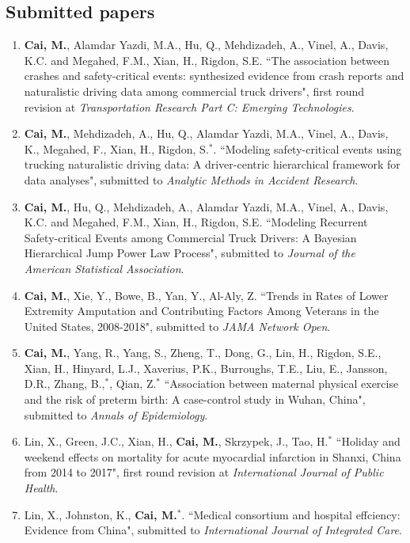\documentclass[11pt, a4paper]{article}
\begin{document}
	\subsection*{Submitted papers}
	\begin{enumerate}[leftmargin=0ex,itemsep=1ex]
		\item \textbf{Cai, M.}, Alamdar Yazdi, M.A., Hu, Q., Mehdizadeh, A., Vinel, A., Davis, K.C. and Megahed, F.M., Xian, H., Rigdon, S.E. ``The association between crashes and safety-critical events: synthesized evidence from crash reports and naturalistic driving data among commercial truck drivers", first round revision at \emph{Transportation Research Part C: Emerging Technologies}.
		
		\item \textbf{Cai, M.}, Mehdizadeh, A., Hu, Q., Alamdar Yazdi, M.A., Vinel, A., Davis, K., Megahed, F., Xian, H., Rigdon, S.$^\ast$. ``Modeling safety-critical events using trucking naturalistic driving data: A driver-centric hierarchical framework for data analyses", submitted to \emph{Analytic Methods in Accident Research}.
		
		\item \textbf{Cai, M.}, Hu, Q., Mehdizadeh, A., Alamdar Yazdi, M.A., Vinel, A., Davis, K.C. and Megahed, F.M., Xian, H., Rigdon, S.E. ``Modeling Recurrent Safety-critical Events among Commercial Truck Drivers: A Bayesian Hierarchical Jump Power Law Process", submitted to \emph{Journal of the American Statistical Association}.
		
		\item \textbf{Cai, M.}, Xie, Y., Bowe, B., Yan, Y., Al-Aly, Z. ``Trends in Rates of Lower Extremity Amputation and Contributing Factors Among Veterans in the United States, 2008-2018", submitted to \emph{JAMA Network Open}.
		
		\item \textbf{Cai, M.}, Yang, R., Yang, S., Zheng, T., Dong, G., Lin, H., Rigdon, S.E., Xian, H., Hinyard, L.J., Xaverius, P.K., Burroughs, T.E., Liu, E., Jansson, D.R., Zhang, B.,$^\ast$, Qian, Z.$^\ast$ ``Association between maternal physical exercise and the risk of preterm birth: A case-control study in Wuhan, China", submitted to \emph{Annals of Epidemiology}.
		
		\item Lin, X., Green, J.C., Xian, H., \textbf{Cai, M.}, Skrzypek, J., Tao, H.$^\ast$ ``Holiday and weekend effects on mortality for acute myocardial infarction in Shanxi, China from 2014 to 2017", first round revision at \emph{International Journal of Public Health}.
		
		\item Lin, X., Johnston, K., \textbf{Cai, M.$^*$}. ``Medical consortium and hospital effciency: Evidence from China", submitted to \emph{International Journal of Integrated Care}.
	\end{enumerate}
	
\end{document}
